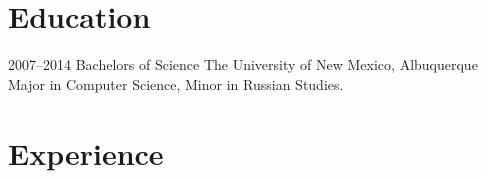 \documentclass[]{friggeri-cv} %
\begin{document}
\section{Education}

\begin{entrylist}
\entry
{2007--2014}
{Bachelors {\normalfont of Science}}
{The University of New Mexico, Albuquerque}
{Major in Computer Science, Minor in Russian Studies.}
\end{entrylist}


\section{Experience}
\end{document}
